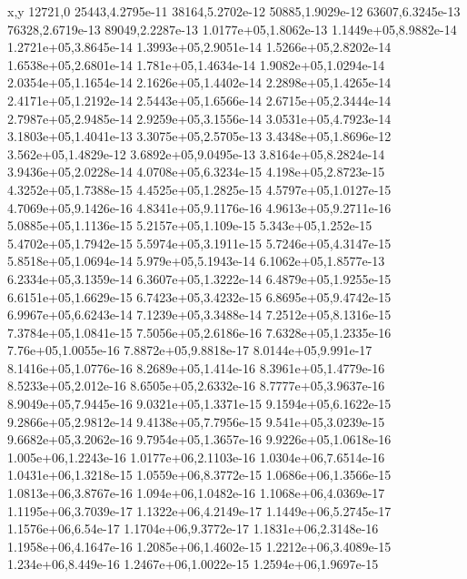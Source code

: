 x,y
12721,0
25443,4.2795e-11
38164,5.2702e-12
50885,1.9029e-12
63607,6.3245e-13
76328,2.6719e-13
89049,2.2287e-13
1.0177e+05,1.8062e-13
1.1449e+05,8.9882e-14
1.2721e+05,3.8645e-14
1.3993e+05,2.9051e-14
1.5266e+05,2.8202e-14
1.6538e+05,2.6801e-14
1.781e+05,1.4634e-14
1.9082e+05,1.0294e-14
2.0354e+05,1.1654e-14
2.1626e+05,1.4402e-14
2.2898e+05,1.4265e-14
2.4171e+05,1.2192e-14
2.5443e+05,1.6566e-14
2.6715e+05,2.3444e-14
2.7987e+05,2.9485e-14
2.9259e+05,3.1556e-14
3.0531e+05,4.7923e-14
3.1803e+05,1.4041e-13
3.3075e+05,2.5705e-13
3.4348e+05,1.8696e-12
3.562e+05,1.4829e-12
3.6892e+05,9.0495e-13
3.8164e+05,8.2824e-14
3.9436e+05,2.0228e-14
4.0708e+05,6.3234e-15
4.198e+05,2.8723e-15
4.3252e+05,1.7388e-15
4.4525e+05,1.2825e-15
4.5797e+05,1.0127e-15
4.7069e+05,9.1426e-16
4.8341e+05,9.1176e-16
4.9613e+05,9.2711e-16
5.0885e+05,1.1136e-15
5.2157e+05,1.109e-15
5.343e+05,1.252e-15
5.4702e+05,1.7942e-15
5.5974e+05,3.1911e-15
5.7246e+05,4.3147e-15
5.8518e+05,1.0694e-14
5.979e+05,5.1943e-14
6.1062e+05,1.8577e-13
6.2334e+05,3.1359e-14
6.3607e+05,1.3222e-14
6.4879e+05,1.9255e-15
6.6151e+05,1.6629e-15
6.7423e+05,3.4232e-15
6.8695e+05,9.4742e-15
6.9967e+05,6.6243e-14
7.1239e+05,3.3488e-14
7.2512e+05,8.1316e-15
7.3784e+05,1.0841e-15
7.5056e+05,2.6186e-16
7.6328e+05,1.2335e-16
7.76e+05,1.0055e-16
7.8872e+05,9.8818e-17
8.0144e+05,9.991e-17
8.1416e+05,1.0776e-16
8.2689e+05,1.414e-16
8.3961e+05,1.4779e-16
8.5233e+05,2.012e-16
8.6505e+05,2.6332e-16
8.7777e+05,3.9637e-16
8.9049e+05,7.9445e-16
9.0321e+05,1.3371e-15
9.1594e+05,6.1622e-15
9.2866e+05,2.9812e-14
9.4138e+05,7.7956e-15
9.541e+05,3.0239e-15
9.6682e+05,3.2062e-16
9.7954e+05,1.3657e-16
9.9226e+05,1.0618e-16
1.005e+06,1.2243e-16
1.0177e+06,2.1103e-16
1.0304e+06,7.6514e-16
1.0431e+06,1.3218e-15
1.0559e+06,8.3772e-15
1.0686e+06,1.3566e-15
1.0813e+06,3.8767e-16
1.094e+06,1.0482e-16
1.1068e+06,4.0369e-17
1.1195e+06,3.7039e-17
1.1322e+06,4.2149e-17
1.1449e+06,5.2745e-17
1.1576e+06,6.54e-17
1.1704e+06,9.3772e-17
1.1831e+06,2.3148e-16
1.1958e+06,4.1647e-16
1.2085e+06,1.4602e-15
1.2212e+06,3.4089e-15
1.234e+06,8.449e-16
1.2467e+06,1.0022e-15
1.2594e+06,1.9697e-15
